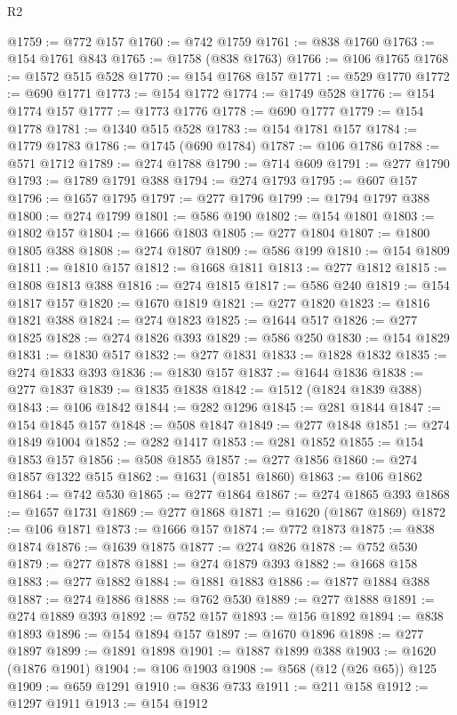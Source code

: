 \begin{lexlean}{R2}
\begin{coremodule}
@1759 := @772 @157
@1760 := @742 @1759
@1761 := @838 @1760
@1763 := @154 @1761 @843
@1765 := @1758 (@838 @1763)
@1766 := @106 @1765
@1768 := @1572 @515 @528
@1770 := @154 @1768 @157
@1771 := @529 @1770
@1772 := @690 @1771
@1773 := @154 @1772
@1774 := @1749 @528
@1776 := @154 @1774 @157
@1777 := @1773 @1776
@1778 := @690 @1777
@1779 := @154 @1778
@1781 := @1340 @515 @528
@1783 := @154 @1781 @157
@1784 := @1779 @1783
@1786 := @1745 (@690 @1784)
@1787 := @106 @1786
@1788 := @571 @1712
@1789 := @274 @1788
@1790 := @714 @609
@1791 := @277 @1790
@1793 := @1789 @1791 @388
@1794 := @274 @1793
@1795 := @607 @157
@1796 := @1657 @1795
@1797 := @277 @1796
@1799 := @1794 @1797 @388
@1800 := @274 @1799
@1801 := @586 @190
@1802 := @154 @1801
@1803 := @1802 @157
@1804 := @1666 @1803
@1805 := @277 @1804
@1807 := @1800 @1805 @388
@1808 := @274 @1807
@1809 := @586 @199
@1810 := @154 @1809
@1811 := @1810 @157
@1812 := @1668 @1811
@1813 := @277 @1812
@1815 := @1808 @1813 @388
@1816 := @274 @1815
@1817 := @586 @240
@1819 := @154 @1817 @157
@1820 := @1670 @1819
@1821 := @277 @1820
@1823 := @1816 @1821 @388
@1824 := @274 @1823
@1825 := @1644 @517
@1826 := @277 @1825
@1828 := @274 @1826 @393
@1829 := @586 @250
@1830 := @154 @1829
@1831 := @1830 @517
@1832 := @277 @1831
@1833 := @1828 @1832
@1835 := @274 @1833 @393
@1836 := @1830 @157
@1837 := @1644 @1836
@1838 := @277 @1837
@1839 := @1835 @1838
@1842 := @1512 (@1824 @1839 @388)
@1843 := @106 @1842
@1844 := @282 @1296
@1845 := @281 @1844
@1847 := @154 @1845 @157
@1848 := @508 @1847
@1849 := @277 @1848
@1851 := @274 @1849 @1004
@1852 := @282 @1417
@1853 := @281 @1852
@1855 := @154 @1853 @157
@1856 := @508 @1855
@1857 := @277 @1856
@1860 := @274 @1857 @1322 @515
@1862 := @1631 (@1851 @1860)
@1863 := @106 @1862
@1864 := @742 @530
@1865 := @277 @1864
@1867 := @274 @1865 @393
@1868 := @1657 @1731
@1869 := @277 @1868
@1871 := @1620 (@1867 @1869)
@1872 := @106 @1871
@1873 := @1666 @157
@1874 := @772 @1873
@1875 := @838 @1874
@1876 := @1639 @1875
@1877 := @274 @826
@1878 := @752 @530
@1879 := @277 @1878
@1881 := @274 @1879 @393
@1882 := @1668 @158
@1883 := @277 @1882
@1884 := @1881 @1883
@1886 := @1877 @1884 @388
@1887 := @274 @1886
@1888 := @762 @530
@1889 := @277 @1888
@1891 := @274 @1889 @393
@1892 := @752 @157
@1893 := @156 @1892
@1894 := @838 @1893
@1896 := @154 @1894 @157
@1897 := @1670 @1896
@1898 := @277 @1897
@1899 := @1891 @1898
@1901 := @1887 @1899 @388
@1903 := @1620 (@1876 @1901)
@1904 := @106 @1903
@1908 := @568 (@12 (@26 @65)) @125
@1909 := @659 @1291
@1910 := @836 @733
@1911 := @211 @158
@1912 := @1297 @1911
@1913 := @154 @1912

\end{coremodule}
\end{lexlean}

